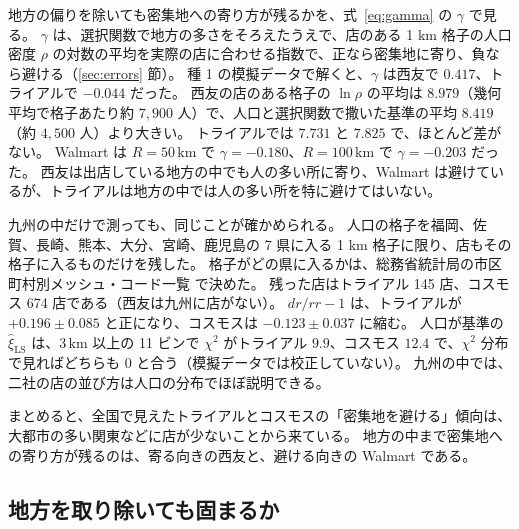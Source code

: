 \documentclass[a4paper,11pt]{ltjsarticle}
\begin{document}
地方の偏りを除いても密集地への寄り方が残るかを、式~\eqref{eq:gamma} の $\gamma$ で見る。
$\gamma$ は、選択関数で地方の多さをそろえたうえで、店のある 1 km 格子の人口密度 $\rho$ の対数の平均を実際の店に合わせる指数で、正なら密集地に寄り、負なら避ける（\ref{sec:errors} 節）。
種 1 の模擬データで解くと、$\gamma$ は西友で $0.417$、トライアルで $-0.044$ だった。
西友の店のある格子の $\ln\rho$ の平均は $8.979$（幾何平均で格子あたり約 $7{,}900$ 人）で、人口と選択関数で撒いた基準の平均 $8.419$（約 $4{,}500$ 人）より大きい。
トライアルでは $7.731$ と $7.825$ で、ほとんど差がない。
Walmart は $R = 50\,\mathrm{km}$ で $\gamma = -0.180$、$R = 100\,\mathrm{km}$ で $\gamma = -0.203$ だった。
西友は出店している地方の中でも人の多い所に寄り、Walmart は避けているが、トライアルは地方の中では人の多い所を特に避けてはいない。

九州の中だけで測っても、同じことが確かめられる。
人口の格子を福岡、佐賀、長崎、熊本、大分、宮崎、鹿児島の 7 県に入る 1 km 格子に限り、店もその格子に入るものだけを残した。
格子がどの県に入るかは、総務省統計局の市区町村別メッシュ・コード一覧 \cite{StatMeshCode} で決めた。
残った店はトライアル 145 店、コスモス 674 店である（西友は九州に店がない）。
$dr/rr - 1$ は、トライアルが $+0.196 \pm 0.085$ と正になり、コスモスは $-0.123 \pm 0.037$ に縮む。
人口が基準の $\hat\xi_{\mathrm{LS}}$ は、$3\,\mathrm{km}$ 以上の 11 ビンで $\chi^2$ がトライアル $9.9$、コスモス $12.4$ で、$\chi^2$ 分布で見ればどちらも $0$ と合う（模擬データでは校正していない）。
九州の中では、二社の店の並び方は人口の分布でほぼ説明できる。

まとめると、全国で見えたトライアルとコスモスの「密集地を避ける」傾向は、大都市の多い関東などに店が少ないことから来ている。
地方の中まで密集地への寄り方が残るのは、寄る向きの西友と、避ける向きの Walmart である。

\subsection{地方を取り除いても固まるか}
\label{sec:res-footprint}
\end{document}
